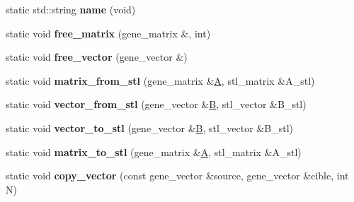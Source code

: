 \begin{DoxyCompactItemize}
\item 
\mbox{\label{class_s_t_l__interface_a88e34ca25fa633cfc364fe841e737ed9}} 
static std\+::string {\bfseries name} (void)
\item 
\mbox{\label{class_s_t_l__interface_af794a00f163660a6bdd08417970daf00}} 
static void {\bfseries free\+\_\+matrix} (gene\+\_\+matrix \&, int)
\item 
\mbox{\label{class_s_t_l__interface_a797d9b4b7da63b67618793d1c7978d87}} 
static void {\bfseries free\+\_\+vector} (gene\+\_\+vector \&)
\item 
\mbox{\label{class_s_t_l__interface_adc82befb0d9bd90f584fc12b67d95ed5}} 
static void {\bfseries matrix\+\_\+from\+\_\+stl} (gene\+\_\+matrix \&\hyperlink{group___core___module_class_eigen_1_1_matrix}{A}, stl\+\_\+matrix \&A\+\_\+stl)
\item 
\mbox{\label{class_s_t_l__interface_aa168e5b02c97c44299f2abdf835fa89c}} 
static void {\bfseries vector\+\_\+from\+\_\+stl} (gene\+\_\+vector \&\hyperlink{group___core___module_class_eigen_1_1_matrix}{B}, stl\+\_\+vector \&B\+\_\+stl)
\item 
\mbox{\label{class_s_t_l__interface_a0ec555feb122458696a019bc0df2b764}} 
static void {\bfseries vector\+\_\+to\+\_\+stl} (gene\+\_\+vector \&\hyperlink{group___core___module_class_eigen_1_1_matrix}{B}, stl\+\_\+vector \&B\+\_\+stl)
\item 
\mbox{\label{class_s_t_l__interface_adb3c526d2e2da24fdcc8fa9f1566fccb}} 
static void {\bfseries matrix\+\_\+to\+\_\+stl} (gene\+\_\+matrix \&\hyperlink{group___core___module_class_eigen_1_1_matrix}{A}, stl\+\_\+matrix \&A\+\_\+stl)
\item 
\mbox{\label{class_s_t_l__interface_a5ffdb0a323ab2c3a27ffb80a8c3eaa05}} 
static void {\bfseries copy\+\_\+vector} (const gene\+\_\+vector \&source, gene\+\_\+vector \&cible, int N)
\item 
\mbox{\label{class_s_t_l__interface_a39046fc2eadea7d186c78c75243802e0}} 

\end{DoxyCompactItemize}
